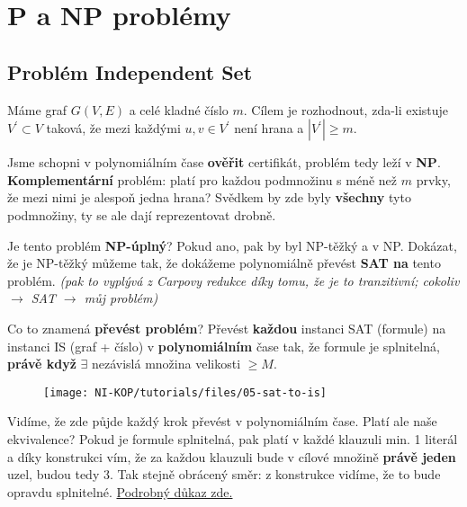 \section{P a NP problémy}

\subsection{Problém Independent Set}

Máme graf $G(V,E)$ a celé kladné číslo $m$. Cílem je rozhodnout, zda-li existuje $V^\prime \subset V$ taková, že mezi každými $u,v \in V^\prime$ není hrana a $|V^\prime| \geq m$.

\vspace{4pt}
\noindent Jsme schopni v polynomiálním čase \textbf{ověřit} certifikát, problém tedy leží v \textbf{NP}. \textbf{Komplementární} problém: platí pro každou podmnožinu s méně než $m$ prvky, že mezi nimi je alespoň jedna hrana? Svědkem by zde byly \textbf{všechny} tyto podmnožiny, ty se ale dají reprezentovat drobně.

\vspace{4pt}
\noindent Je tento problém \textbf{NP-úplný}? Pokud ano, pak by byl NP-těžký a v NP. Dokázat, že je NP-těžký můžeme tak, že dokážeme polynomiálně převést \textbf{SAT na} tento problém. \textit{(pak to vyplývá z Carpovy redukce díky tomu, že je to tranzitivní; cokoliv $\to$ SAT $\to$ můj problém)}

\vspace{4pt}
\noindent Co to znamená \textbf{převést problém}? Převést \textbf{každou} instanci SAT (formule) na instanci IS (graf + číslo) v \textbf{polynomiálním} čase tak, že formule je splnitelná, \textbf{právě když} $\exists$ nezávislá množina velikosti $\geq M$.

\begin{figure}[H]
\texttt{[image: NI-KOP/tutorials/files/05-sat-to-is]}
\end{figure}

\vspace{4pt}
\noindent Vidíme, že zde půjde každý krok převést v polynomiálním čase. Platí ale naše ekvivalence? Pokud je formule splnitelná, pak platí v každé klauzuli min. 1 literál a díky konstrukci vím, že za každou klauzuli bude v cílové množině \textbf{právě jeden} uzel, budou tedy 3. Tak stejně obrácený směr: z konstrukce vidíme, že to bude opravdu splnitelné. \href{https://courses.engr.illinois.edu/cs374/fa2020/lec_prerec/23/23_2_0_0.pdf}{Podrobný důkaz zde.}

